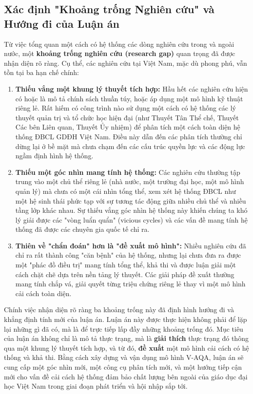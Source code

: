 \documentclass[12pt, a4paper, openany]{report}
\begin{document}
\subsection{Xác định "Khoảng trống Nghiên cứu" và Hướng đi của Luận án}
\label{subsec:xac_dinh_khoang_trong}

Từ việc tổng quan một cách có hệ thống các dòng nghiên cứu trong và ngoài nước, một \textbf{khoảng trống nghiên cứu (research gap)} quan trọng đã được nhận diện rõ ràng. Cụ thể, các nghiên cứu tại Việt Nam, mặc dù phong phú, vẫn tồn tại ba hạn chế chính:
\begin{enumerate}
    \item \textbf{Thiếu vắng một khung lý thuyết tích hợp:} Hầu hết các nghiên cứu hiện có hoặc là mô tả chính sách thuần túy, hoặc áp dụng một mô hình kỹ thuật riêng lẻ. Rất hiếm có công trình nào sử dụng một cách có hệ thống các lý thuyết quản trị và tổ chức học hiện đại (như Thuyết Tân Thể chế, Thuyết Các bên Liên quan, Thuyết Ủy nhiệm) để phân tích một cách toàn diện hệ thống ĐBCL GDĐH Việt Nam. Điều này dẫn đến các phân tích thường chỉ dừng lại ở bề mặt mà chưa chạm đến các cấu trúc quyền lực và các động lực ngầm định hình hệ thống.
    
    \item \textbf{Thiếu một góc nhìn mang tính hệ thống:} Các nghiên cứu thường tập trung vào một chủ thể riêng lẻ (nhà nước, một trường đại học, một mô hình quản lý) mà chưa có một cái nhìn tổng thể, xem xét hệ thống ĐBCL như một hệ sinh thái phức tạp với sự tương tác động giữa nhiều chủ thể và nhiều tầng lớp khác nhau. Sự thiếu vắng góc nhìn hệ thống này khiến chúng ta khó lý giải được các "vòng luẩn quẩn" (vicious cycles) và các vấn đề mang tính hệ thống đã được các chuyên gia quốc tế chỉ ra.
    
    \item \textbf{Thiên về "chẩn đoán" hơn là "đề xuất mô hình":} Nhiều nghiên cứu đã chỉ ra rất thành công "căn bệnh" của hệ thống, nhưng lại chưa đưa ra được một "phác đồ điều trị" mang tính tổng thể, khả thi và được luận giải một cách chặt chẽ dựa trên nền tảng lý thuyết. Các giải pháp đề xuất thường mang tính chắp vá, giải quyết từng triệu chứng riêng lẻ thay vì một mô hình cải cách toàn diện.
\end{enumerate}

Chính việc nhận diện rõ ràng ba khoảng trống này đã định hình hướng đi và khẳng định tính mới của luận án. Luận án này được thực hiện không phải để lặp lại những gì đã có, mà là để trực tiếp lấp đầy những khoảng trống đó. Mục tiêu của luận án không chỉ là mô tả thực trạng, mà là \textbf{giải thích} thực trạng đó thông qua một khung lý thuyết tích hợp, và từ đó, \textbf{đề xuất} một mô hình cải cách có hệ thống và khả thi. Bằng cách xây dựng và vận dụng mô hình V-AQA, luận án sẽ cung cấp một góc nhìn mới, một công cụ phân tích mới, và một hướng tiếp cận mới cho vấn đề cải cách hệ thống đảm bảo chất lượng bên ngoài của giáo dục đại học Việt Nam trong giai đoạn phát triển và hội nhập sắp tới.
\end{document}
